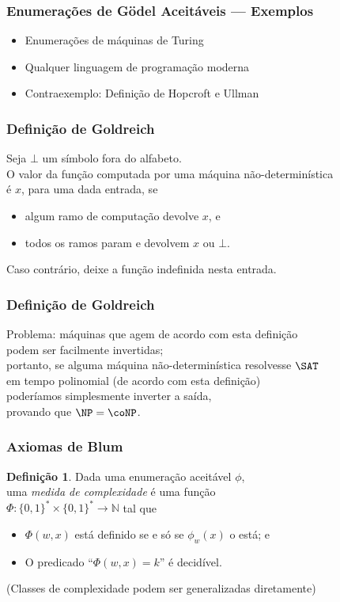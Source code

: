 \documentclass[utf8,notheorems]{beamer}
\theoremstyle{definition}
\newtheorem*{definition}{Definição}
\begin{document}
\begin{frame}
    \frametitle{Enumerações de Gödel Aceitáveis --- Exemplos}
    \begin{itemize}
        \item Enumerações de máquinas de Turing
        \item Qualquer linguagem de programação moderna
        \item Contraexemplo: Definição de Hopcroft e Ullman
    \end{itemize}
\end{frame}

\begin{frame}
    \frametitle{Definição de Goldreich}
    Seja $\bot$ um símbolo fora do alfabeto. \\
    O valor da função computada por uma máquina não-determinística \\
    é $x$, para uma dada entrada, se
    \begin{itemize}
        \item algum ramo de computação devolve $x$, e
        \item todos os ramos param e devolvem $x$ ou $\bot$.
    \end{itemize}
    Caso contrário, deixe a função indefinida nesta entrada.
    \cite[p.~313]{HopcroftUllman1979}
\end{frame}

\begin{frame}
    \frametitle{Definição de Goldreich}
    Problema: máquinas que agem de acordo com esta definição \\
    podem ser facilmente invertidas;\\
    portanto, se alguma máquina não-determinística resolvesse $\SAT$ \\
    em tempo polinomial (de acordo com esta definição) \\
    poderíamos simplesmente inverter a saída, \\
    provando que $\NP = \coNP$.
\end{frame}

\begin{frame}
    \frametitle{Axiomas de Blum}
    \begin{definition}
        Dada uma enumeração aceitável $\phi$, \\
        uma \emph{medida de complexidade} é uma função \\
        $\Phi: \{0, 1\}^* \times \{0, 1\}^* \to \mathbb N$ tal que~\cite[p.~324]{Blum1967}
        \begin{itemize}
            \item $\Phi(w, x)$ está definido se e só se $\phi_w(x)$ o está; e \\
            \item O predicado ``$\Phi(w, x) = k$'' é decidível.
        \end{itemize}
    \end{definition}
    (Classes de complexidade podem ser generalizadas diretamente)
\end{frame}
\end{document}
